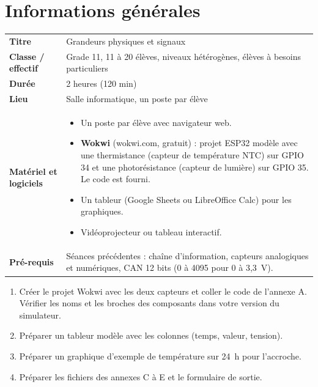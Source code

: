 \documentclass[11pt,a4paper]{article}
\begin{document}

\section{Informations générales}
\begin{tabularx}{\linewidth}{>{\bfseries}p{3.6cm}Y}
\toprule
Titre & Grandeurs physiques et signaux\\
Classe / effectif & Grade 11, 11 à 20 élèves, niveaux hétérogènes, élèves à besoins particuliers\\
Durée & 2 heures (120 min)\\
Lieu & Salle informatique, un poste par élève\\
Matériel et logiciels &
\begin{itemize}
 \item Un poste par élève avec navigateur web.
 \item \textbf{Wokwi} (wokwi.com, gratuit) : projet ESP32 modèle avec une thermistance (capteur de température NTC) sur GPIO 34 et une photorésistance (capteur de lumière) sur GPIO 35. Le code est fourni.
 \item Un tableur (Google Sheets ou LibreOffice Calc) pour les graphiques.
 \item Vidéoprojecteur ou tableau interactif.
\end{itemize}\\
Pré-requis &
Séances précédentes : chaîne d'information, capteurs analogiques et numériques, CAN 12 bits (0 à 4095 pour 0 à 3,3~V).\\
\bottomrule
\end{tabularx}

\begin{astuce}
\begin{enumerate}
 \item Créer le projet Wokwi avec les deux capteurs et coller le code de l'annexe A. Vérifier les noms et les broches des composants dans votre version du simulateur.
 \item Préparer un tableur modèle avec les colonnes (temps, valeur, tension).
 \item Préparer un graphique d'exemple de température sur 24~h pour l'accroche.
 \item Préparer les fichiers des annexes C à E et le formulaire de sortie.
\end{enumerate}
\end{astuce}
\end{document}
